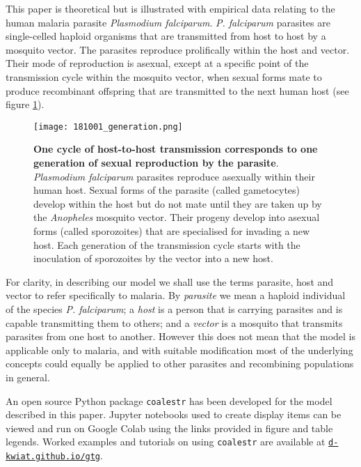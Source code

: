 \documentclass[_main.tex]{subfiles}
\begin{document}
This paper is theoretical but is illustrated with empirical data relating to the human malaria parasite \textit{Plasmodium falciparum}.  \textit{P. falciparum} parasites are single-celled haploid organisms that are transmitted from host to host by a mosquito vector.  The parasites reproduce prolifically within the host and vector.  Their mode of reproduction is asexual, except at a specific point of the transmission cycle within the mosquito vector, when sexual forms mate to produce recombinant offspring that are transmitted to the next human host (see figure \ref{fig:one_generation}).

\begin{figure}[h!]
\centering
\texttt{[image: 181001\_generation.png]}
\caption{\textbf{One cycle of host-to-host transmission corresponds to one generation of sexual reproduction by the parasite}.  \textit{Plasmodium falciparum} parasites reproduce asexually within their human host.  Sexual forms of the parasite (called gametocytes) develop within the host but do not mate until they are taken up by the \textit{Anopheles} mosquito vector.  Their progeny develop into asexual forms (called sporozoites) that are specialised for invading a new host.  Each generation of the transmission cycle starts with the inoculation of sporozoites by the vector into a new host.
}
\label{fig:one_generation}
\end{figure}

For clarity, in describing our model we shall use the terms parasite, host and vector to refer specifically to malaria.  By \textit{parasite} we mean a haploid individual of the species \textit{P. falciparum}; a \textit{host} is a person that is carrying parasites and is capable transmitting them to others; and a \textit{vector} is a mosquito that transmits parasites from one host to another.  However this does not mean that the model is applicable only to malaria, and with suitable modification most of the underlying concepts could equally be applied to other parasites and recombining populations in general. 

An open source Python package \texttt{coalestr} has been developed for the model described in this paper.  Jupyter notebooks used to create display items can be viewed and run on Google Colab using the links provided in figure and table legends.  Worked examples and tutorials on using \texttt{coalestr} are available at \href{https://d-kwiat.github.io/gtg}{\texttt{d-kwiat.github.io/gtg}}.  
\end{document}
